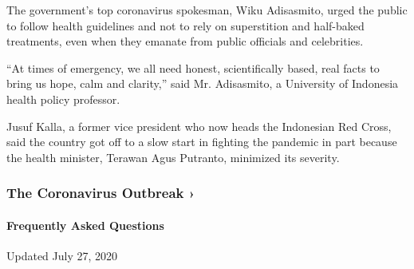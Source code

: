 The government's top coronavirus spokesman, Wiku Adisasmito, urged the
public to follow health guidelines and not to rely on superstition and
half-baked treatments, even when they emanate from public officials and
celebrities.

``At times of emergency, we all need honest, scientifically based, real
facts to bring us hope, calm and clarity,'' said Mr. Adisasmito, a
University of Indonesia health policy professor.

Jusuf Kalla, a former vice president who now heads the Indonesian Red
Cross, said the country got off to a slow start in fighting the pandemic
in part because the health minister, Terawan Agus Putranto, minimized
its severity.

\href{https://www.nytimes3xbfgragh.onion/news-event/coronavirus?action=click\&pgtype=Article\&state=default\&region=MAIN_CONTENT_3\&context=storylines_faq}{}

\hypertarget{the-coronavirus-outbreak-}{%
\subsubsection{The Coronavirus Outbreak
›}\label{the-coronavirus-outbreak-}}

\hypertarget{frequently-asked-questions}{%
\paragraph{Frequently Asked
Questions}\label{frequently-asked-questions}}

Updated July 27, 2020


